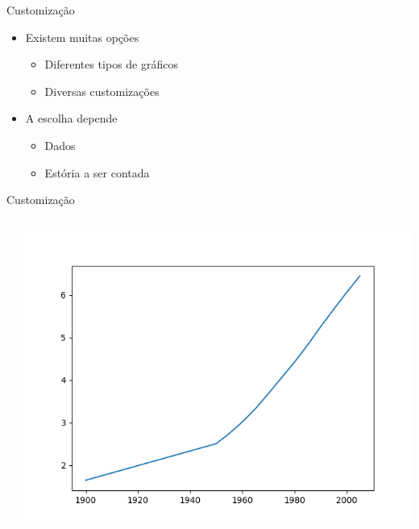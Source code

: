 \begin{frame}[t, fragile]{Customização}
  \begin{itemize}
    \item Existem muitas opções
    \begin{itemize}
      \item Diferentes tipos de gráficos
      \item Diversas customizações
    \end{itemize}
    \item A escolha depende
    \begin{itemize}
      \item Dados
      \item Estória a ser contada
    \end{itemize}
  \end{itemize}
\end{frame}
%
\begin{frame}[t, fragile]{Customização}
  \begin{columns}
    \begin{column}{0.55\textwidth}
          
    \end{column}

    \begin{column}{0.45\textwidth}
      \begin{center}
        \includegraphics[scale=.35]{aula-2/figuras/matplotlib-customization-1.png}
      \end{center}
    \end{column}
  \end{columns}
\end{frame}
